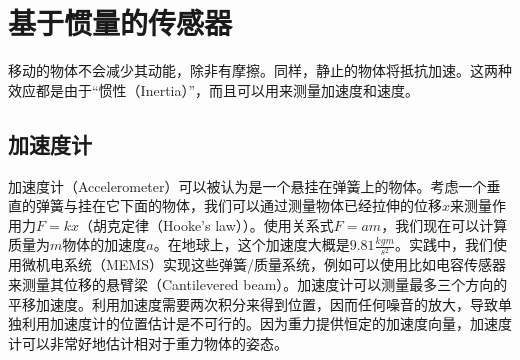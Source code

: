 \section{基于惯量的传感器}
移动的物体不会减少其动能，除非有摩擦。同样，静止的物体将抵抗加速。这两种效应都是由于“惯性（Inertia）”，而且可以用来测量加速度和速度。


\subsection{加速度计}
加速度计（Accelerometer）可以被认为是一个悬挂在弹簧上的物体。考虑一个垂直的弹簧与挂在它下面的物体，我们可以通过测量物体已经拉伸的位移$x$来测量作用力$F=kx$（胡克定律（Hooke's law））。使用关系式$F=am$，我们现在可以计算质量为$m$物体的加速度$a$。在地球上，这个加速度大概是$9.81\frac{kgm}{s^2}$。实践中，我们使用微机电系统（MEMS）实现这些弹簧/质量系统，例如可以使用比如电容传感器来测量其位移的悬臂梁（Cantilevered beam）。加速度计可以测量最多三个方向的平移加速度。利用加速度需要两次积分来得到位置，因而任何噪音的放大，导致单独利用加速度计的位置估计是不可行的。因为重力提供恒定的加速度向量，加速度计可以非常好地估计相对于重力物体的姿态。



